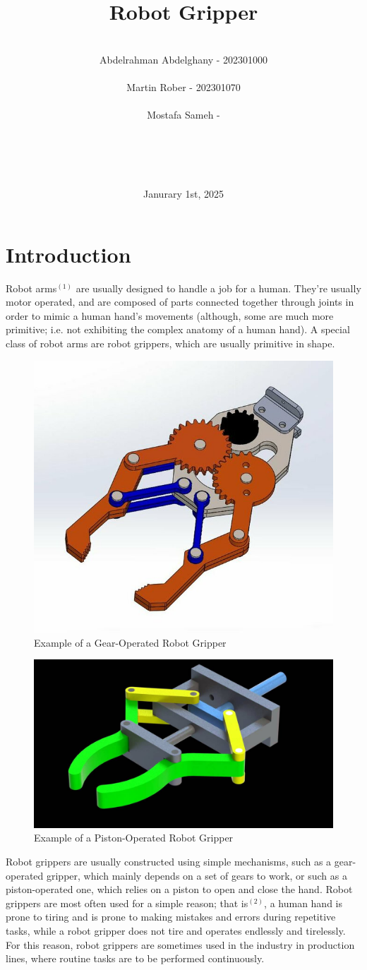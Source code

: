 \documentclass{article}
\title{Robot Gripper}
\author{ \\ Abdelrahman Abdelghany - 202301000 \\ \\ Martin Rober - 202301070 \\ \\ Mostafa Sameh - \\ \\ \\ \\ \\  }
\date{Janurary 1st, 2025}
\begin{document}
\maketitle

\newpage
\section*{Introduction}
Robot arms$^{(1)}$ are usually designed to handle a job for a human. They're usually motor operated,
and are composed of parts connected together through joints in order to mimic a human hand's movements
(although, some are much more primitive; i.e. not exhibiting the complex anatomy of a human hand).
\newline \newline
A special class of robot arms are robot grippers, which are usually primitive in shape.
\begin{figure}[h]
    \centering
    \includegraphics[width=0.5\linewidth]{Images/gear-operated_robot_gripper.jpg}
    \caption{Example of a Gear-Operated Robot Gripper}
    \label{fig:f1}
\end{figure}
\begin{figure}[h]
    \centering
    \includegraphics[width=0.5\linewidth]{Images/piston-operated_robot_gripper.jpg}
    \caption{Example of a Piston-Operated Robot Gripper}
    \label{fig:f2}
\end{figure}
\newline
Robot grippers are usually constructed using simple mechanisms, such as a gear-operated gripper,
which mainly depends on a set of gears to work, or such as a piston-operated one, which relies
on a piston to open and close the hand.
\newline \newline
Robot grippers are most often used for a simple reason; that is$^{(2)}$, a human hand is prone to tiring
and is prone to making mistakes and errors during repetitive tasks, while a robot gripper does 
not tire and operates endlessly and tirelessly. For this reason, robot grippers are sometimes used
in the industry in production lines, where routine tasks are to be performed continuously.
\end{document}

